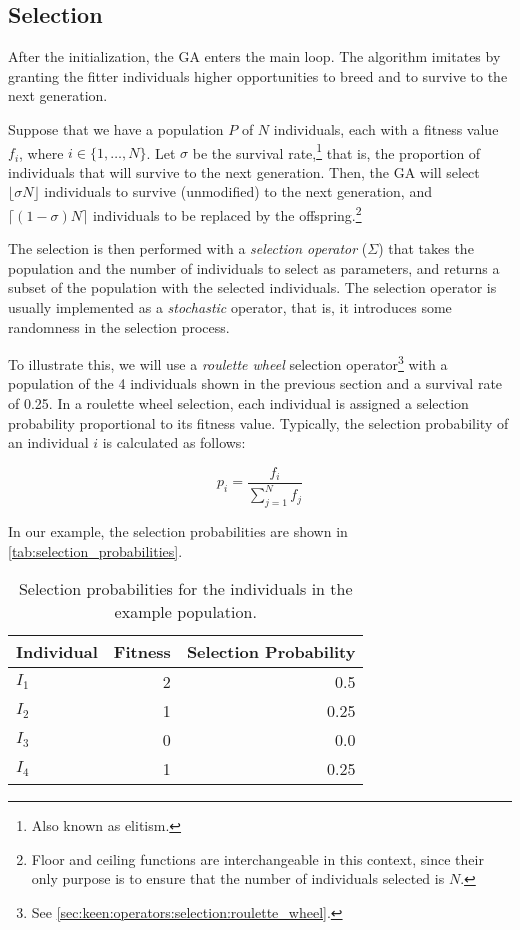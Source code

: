 \subsection{Selection}
\label{sec:genetic_algorithms:selection}
  After the initialization, the GA enters the main loop.
  The algorithm imitates by granting the fitter individuals higher opportunities to breed and to
  survive to the next generation.

  Suppose that we have a population \(P\) of \(N\) individuals, each with a fitness value \(f_i\),
  where \(i \in \{1, \ldots, N\}\).
  Let \(\sigma\) be the survival rate,\footnote{Also known as elitism.} that is, the proportion of 
  individuals that will survive to the next generation.
  Then, the GA will select \(\lfloor\sigma N\rfloor\) individuals to survive (unmodified) to the 
  next generation, and \(\lceil(1 - \sigma)N\rceil\) individuals to be replaced by the 
  offspring.\footnote{Floor and ceiling functions are interchangeable in this context, since their
  only purpose is to ensure that the number of individuals selected is \(N\).}

  The selection is then performed with a \emph{selection operator} (\(\Sigma\)) that takes the 
  population and the number of individuals to select as parameters, and returns a subset of the
  population with the selected individuals.
  The selection operator is usually implemented as a \emph{stochastic} operator, that is, it
  introduces some randomness in the selection process.

  To illustrate this, we will use a \textit{roulette wheel} selection operator\footnote{
    See \vref{sec:keen:operators:selection:roulette_wheel}.
  } with a population of the 4 individuals shown in the previous section and a survival rate of 
  0.25.
  In a roulette wheel selection, each individual is assigned a selection probability proportional
  to its fitness value.
  Typically, the selection probability of an individual \(i\) is calculated as follows:

  \begin{equation}
    \label{eq:selection_probability}
    p_i = \frac{f_i}{\sum_{j=1}^{N}f_j}
  \end{equation}

  In our example, the selection probabilities are shown in \vref{tab:selection_probabilities}.

  \begin{table}[ht!]
    \centering
    \begin{tabular}{|l|r|r|}
      \hline
      Individual  & Fitness & Selection Probability \\
      \hline
      \(I_1\)     & 2       & 0.5  \\
      \(I_2\)     & 1       & 0.25   \\
      \(I_3\)     & 0       & 0.0   \\
      \(I_4\)     & 1       & 0.25  \\
      \hline
    \end{tabular}
    \caption{Selection probabilities for the individuals in the example population.}
    \label{tab:selection_probabilities}
  \end{table}

